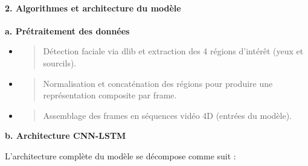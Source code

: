 \documentclass[
]{article}
\begin{document}
\hypertarget{algorithmes-et-architecture-du-moduxe8le}{%
\paragraph{\texorpdfstring{\textbf{2. Algorithmes et architecture du modèle}}{2. Algorithmes et architecture du modèle}}\label{algorithmes-et-architecture-du-moduxe8le}}

\textbf{a. Prétraitement des données}

\begin{itemize}
\item
  \begin{quote}
  Détection faciale via dlib et extraction des 4 régions d'intérêt (yeux et sourcils).
  \end{quote}
\item
  \begin{quote}
  Normalisation et concaténation des régions pour produire une représentation composite par frame.
  \end{quote}
\item
  \begin{quote}
  Assemblage des frames en séquences vidéo 4D (entrées du modèle).
  \end{quote}
\end{itemize}

\textbf{b. Architecture CNN-LSTM}

L'architecture complète du modèle se décompose comme suit :
\end{document}
